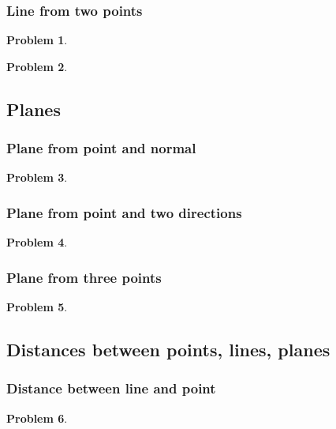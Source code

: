 \documentclass{article}
\newtheorem{problem}{Problem}
\begin{document}
\subsubsection{Line from two points}
\begin{problem}

\end{problem}

\begin{problem}

\end{problem}


\subsection{Planes}
\subsubsection{Plane from point and normal}
\begin{problem}

\end{problem}


\subsubsection{Plane from point and two directions}
\begin{problem}

\end{problem}

\subsubsection{Plane from three points}
\begin{problem}

\end{problem}

\subsection{Distances between points, lines, planes}
\subsubsection{Distance between line and point}
\begin{problem}

\end{problem}
\end{document}
